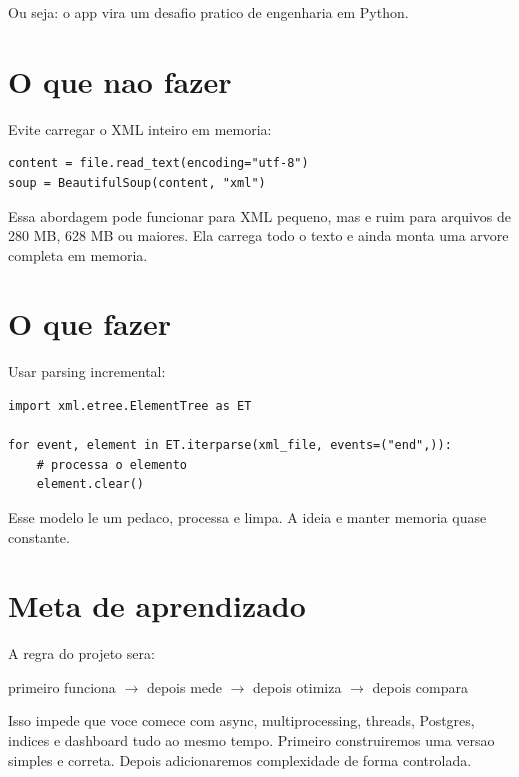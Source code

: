 Ou seja: o app vira um desafio pratico de engenharia em Python.

\section{O que nao fazer}

Evite carregar o XML inteiro em memoria:

\begin{lstlisting}[style=devbutterpython]
content = file.read_text(encoding="utf-8")
soup = BeautifulSoup(content, "xml")
\end{lstlisting}

Essa abordagem pode funcionar para XML pequeno, mas e ruim para arquivos de 280 MB, 628 MB ou maiores. Ela carrega todo o texto e ainda monta uma arvore completa em memoria.

\section{O que fazer}

Usar parsing incremental:

\begin{lstlisting}[style=devbutterpython]
import xml.etree.ElementTree as ET

for event, element in ET.iterparse(xml_file, events=("end",)):
    # processa o elemento
    element.clear()
\end{lstlisting}

Esse modelo le um pedaco, processa e limpa. A ideia e manter memoria quase constante.

\section{Meta de aprendizado}

A regra do projeto sera:

\begin{center}
\Large primeiro funciona $\rightarrow$ depois mede $\rightarrow$ depois otimiza $\rightarrow$ depois compara
\end{center}

Isso impede que voce comece com async, multiprocessing, threads, Postgres, indices e dashboard tudo ao mesmo tempo. Primeiro construiremos uma versao simples e correta. Depois adicionaremos complexidade de forma controlada.
